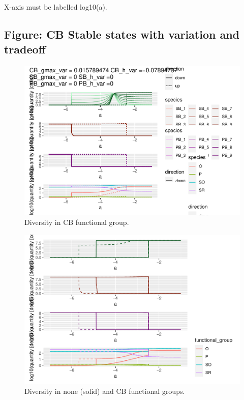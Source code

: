 \documentclass{article}
\begin{document}
X-axis must be labelled log10(a).

\hypertarget{figure-cb-stable-states-with-variation-and-tradeoff}{%
\subsection{Figure: CB Stable states with variation and
tradeoff}\label{figure-cb-stable-states-with-variation-and-tradeoff}}

\begin{figure}

{\centering \includegraphics[width=1\linewidth]{article_files/figure-latex/CB_var1-1} 

}

\caption{Diversity in CB functional group.}\label{fig:CB_var1}
\end{figure}

\begin{figure}

{\centering \includegraphics[width=1\linewidth]{article_files/figure-latex/CB_var2-1} 

}

\caption{Diversity in none (solid) and CB functional groups.}\label{fig:CB_var2}
\end{figure}
\end{document}

